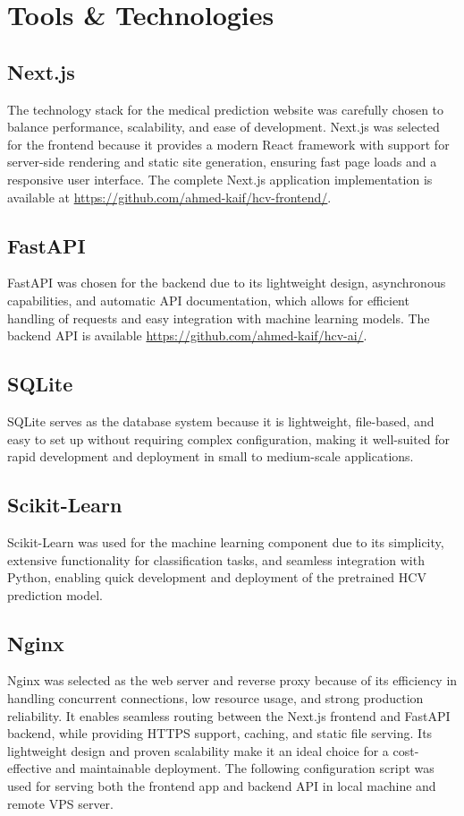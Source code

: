 \section{Tools \& Technologies}
\subsection*{Next.js}
The technology stack for the medical prediction website was carefully chosen to
balance performance, scalability, and ease of development. Next.js was selected
for the frontend because it provides a modern React framework with support
for server-side rendering and static site generation, ensuring fast page loads
and a responsive user interface. The complete Next.js application implementation 
is available at \url{https://github.com/ahmed-kaif/hcv-frontend/}.
\subsection*{FastAPI}
FastAPI was chosen for the backend due to
its lightweight design, asynchronous capabilities, and automatic API documentation,
which allows for efficient handling of requests and easy integration with machine learning models.
The backend API is available \url{https://github.com/ahmed-kaif/hcv-ai/}.
\subsection*{SQLite}
SQLite serves as the database system because it is lightweight, file-based, and easy to set up without
requiring complex configuration, making it well-suited for rapid development and deployment in small to medium-scale applications.
\subsection*{Scikit-Learn}
Scikit-Learn was used for the machine learning component due to its simplicity,
extensive functionality for classification tasks, and seamless integration with Python,
enabling quick development and deployment of the pretrained HCV prediction model.
\subsection*{Nginx}
Nginx was selected as the web server and reverse proxy because of its efficiency
in handling concurrent connections, low resource usage, and strong production reliability.
It enables seamless routing between the Next.js frontend and FastAPI backend, while providing HTTPS support, caching, and static file serving.
Its lightweight design and proven scalability make it an ideal choice for a cost-effective and maintainable deployment.
The following configuration script was used for serving both the frontend app and backend API in local machine and remote VPS server.
\inputminted[fontsize=\footnotesize]{ini}{./codes/nginx.conf}


